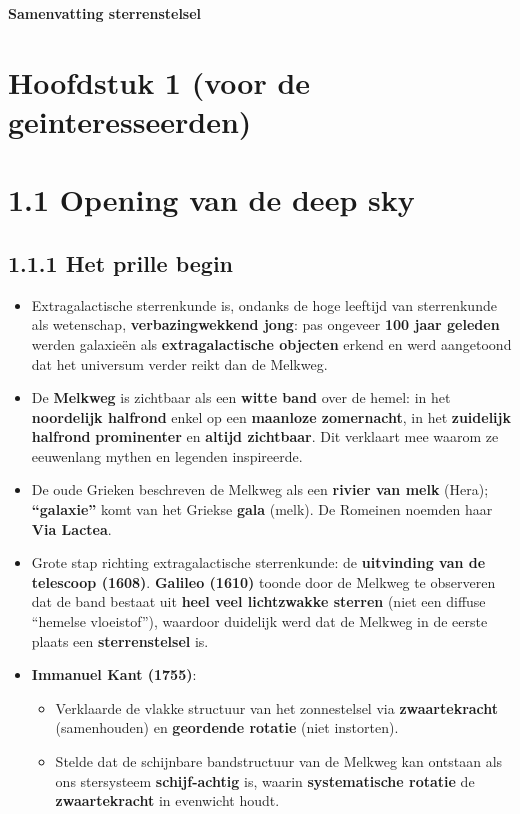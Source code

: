\documentclass[10pt,a4paper]{article}
\begin{document}
\begin{center}
{\Huge\textbf{Samenvatting sterrenstelsel}\par}
\end{center}
\section*{Hoofdstuk 1 (voor de geinteresseerden)}
\section*{1.1 Opening van de deep sky}

\subsection*{1.1.1 Het prille begin}
\begin{itemize}
  \item Extragalactische sterrenkunde is, ondanks de hoge leeftijd van sterrenkunde als wetenschap, \textbf{verbazingwekkend jong}: pas ongeveer \textbf{100 jaar geleden} werden galaxieën als \textbf{extragalactische objecten} erkend en werd aangetoond dat het universum verder reikt dan de Melkweg.
  \item De \textbf{Melkweg} is zichtbaar als een \textbf{witte band} over de hemel: in het \textbf{noordelijk halfrond} enkel op een \textbf{maanloze zomernacht}, in het \textbf{zuidelijk halfrond} \textbf{prominenter} en \textbf{altijd zichtbaar}. Dit verklaart mee waarom ze eeuwenlang mythen en legenden inspireerde.
  \item De oude Grieken beschreven de Melkweg als een \textbf{rivier van melk} (Hera); \textbf{``galaxie''} komt van het Griekse \textbf{gala} (melk). De Romeinen noemden haar \textbf{Via Lactea}.
  \item Grote stap richting extragalactische sterrenkunde: de \textbf{uitvinding van de telescoop (1608)}. \textbf{Galileo (1610)} toonde door de Melkweg te observeren dat de band bestaat uit \textbf{heel veel lichtzwakke sterren} (niet een diffuse ``hemelse vloeistof''), waardoor duidelijk werd dat de Melkweg in de eerste plaats een \textbf{sterrenstelsel} is.
  \item \textbf{Immanuel Kant (1755)}:
  \begin{itemize}
    \item Verklaarde de vlakke structuur van het zonnestelsel via \textbf{zwaartekracht} (samenhouden) en \textbf{geordende rotatie} (niet instorten).
    \item Stelde dat de schijnbare bandstructuur van de Melkweg kan ontstaan als ons stersysteem \textbf{schijf-achtig} is, waarin \textbf{systematische rotatie} de \textbf{zwaartekracht} in evenwicht houdt.

\end{itemize}
\end{itemize}
\end{document}
